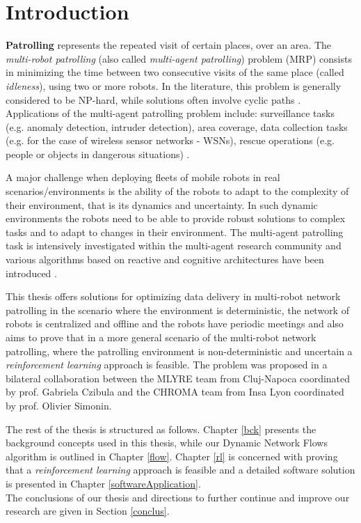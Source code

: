 \chapter*{Introduction}
\label{introduction}

\textbf{Patrolling} represents the repeated visit of certain places, over an area. The \emph{multi-robot patrolling} (also called \textit{multi-agent patrolling}) problem (MRP) consists in minimizing the time between two consecutive visits of the same place (called \emph{idleness}), using two or more robots. In the literature, this problem is generally considered to be NP-hard, while solutions often involve cyclic paths \cite{3,4}. Applications of the multi-agent patrolling problem include: surveillance tasks (e.g. anomaly detection, intruder detection), area coverage, data collection tasks (e.g. for the case of wireless sensor networks - WSNs), rescue operations (e.g. people or objects in dangerous situations) \cite{1,2}. 


A major challenge when deploying fleets of mobile robots in real scenarios/environments is  the ability of the robots to adapt to the complexity of their environment, that is its dynamics and uncertainty. In such dynamic environments the robots need to be able to provide robust solutions to complex tasks and to adapt to changes in their environment. The multi-agent patrolling task is intensively investigated within the multi-agent research community and various algorithms based on reactive and cognitive architectures have been introduced \cite{othmaniguibourg18}.

This thesis offers solutions for optimizing data delivery in multi-robot network patrolling in the scenario where the environment is deterministic, the network of robots is centralized and offline and the robots have periodic meetings and also aims to prove that in a more general scenario of the multi-robot network patrolling, where the patrolling environment is non-deterministic and uncertain a \emph{reinforcement learning} approach is feasible. The problem was proposed in a bilateral collaboration between the MLYRE team from Cluj-Napoca coordinated by prof. Gabriela Czibula and the CHROMA team from Insa Lyon coordinated by prof. Olivier Simonin.

\par The rest of the thesis is structured as follows. Chapter \ref{bck} presents the background concepts used in this thesis, while our Dynamic Network Flows algorithm is outlined in Chapter \ref{flow}. Chapter \ref{rl} is concerned with proving that a \emph{reinforcement learning} approach is feasible and a detailed software solution is presented in  Chapter \ref{softwareApplication}. \\
The conclusions of our thesis and directions to further continue and improve our research are given in Section \ref{conclus}.
